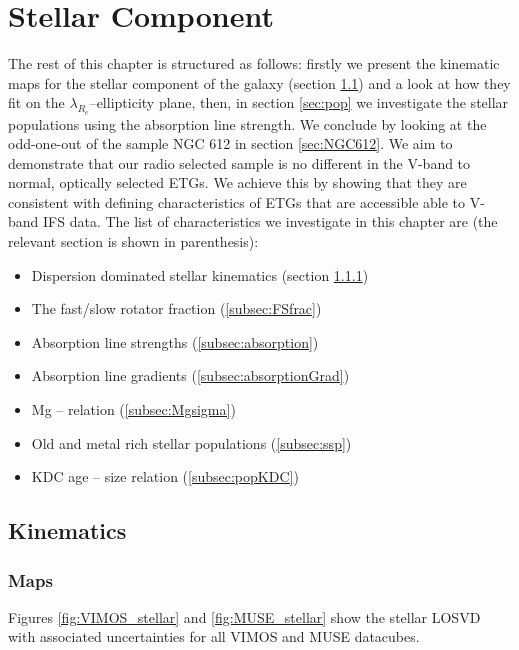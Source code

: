 \chapter{Stellar Component}
	\label{cha:stellar}


The rest of this chapter is structured as follows: firstly we present the kinematic maps for the stellar component of the galaxy (section \ref{sec:stellarKin}) and a look at how they fit on the $\lambda_{R_e}$--ellipticity plane, then, in section \ref{sec:pop} we investigate the stellar populations using the absorption line strength. We conclude by looking at the odd-one-out of the sample NGC 612 in section \ref{sec:NGC612}. We aim to demonstrate that our radio selected sample is no different in the V-band to normal, optically selected ETGs. We achieve this by showing that they are consistent with defining characteristics of ETGs that are accessible able to V-band IFS data. The list of characteristics we investigate in this chapter are (the relevant section is shown in parenthesis):
\begin{itemize}
	\item Dispersion dominated stellar kinematics (section \ref{subsec:maps})
	\item The fast/slow rotator fraction (\ref{subsec:FSfrac})
	\item Absorption line strengths (\ref{subsec:absorption})
	\item Absorption line gradients (\ref{subsec:absorptionGrad})
	\item Mg -- \textsigma relation (\ref{subsec:Mgsigma})
	\item Old and metal rich stellar populations (\ref{subsec:ssp})
	\item KDC age -- size relation (\ref{subsec:popKDC})
\end{itemize}

\section{Kinematics}
	\label{sec:stellarKin}

	\subsection{Maps}
		\label{subsec:maps}


		Figures \ref{fig:VIMOS_stellar} and \ref{fig:MUSE_stellar} show the stellar LOSVD with associated uncertainties for all VIMOS and MUSE datacubes. 


